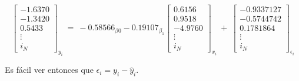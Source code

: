 \documentclass[10pt]{article}
\begin{document}
\begin{equation*}
\begin{bmatrix}
-1.6370\\
-1.3420\\
0.5433\\
\vdots\\
i_{N}
\end{bmatrix}_{y_{i}} \ =\ -0.58566_{\beta 0} - 0.19107_{\beta_{1}}\begin{bmatrix}
0.6156\\
0.9518\\
-4.9760\\
\vdots\\
i_{N}
\end{bmatrix}_{x_{i}} \ +\ \begin{bmatrix}
-0.9337127\\
-0.5744742\\
0.1781864\\
\vdots\\
i_{N}
\end{bmatrix}_{\epsilon_{i}}
\end{equation*}

Es f\'acil ver entonces que $\epsilon_{i}= y_{i}-\hat y_{i}$. 
\end{document}
